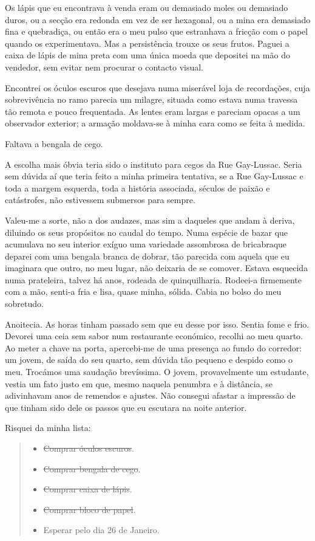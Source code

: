 Os lápis que eu encontrava à venda eram ou demasiado moles ou demasiado
duros, ou a secção era redonda em vez de ser hexagonal, ou a mina era
demasiado fina e quebradiça, ou então era o meu pulso que estranhava a
fricção com o papel quando os experimentava. Mas a persistência trouxe
os seus frutos. Paguei a caixa de lápis de mina preta com uma única
moeda que depositei na mão do vendedor, sem evitar nem procurar o
contacto visual.

Encontrei os óculos escuros que desejava numa miserável loja de
recordações, cuja sobrevivência no ramo parecia um milagre, situada como
estava numa travessa tão remota e pouco frequentada. As lentes eram
largas e pareciam opacas a um observador exterior; a armação moldava-se
à minha cara como se feita à medida.

Faltava a bengala de cego.

A escolha mais óbvia teria sido o instituto para cegos da Rue
Gay-Lussac. Seria sem dúvida aí que teria feito a minha primeira
tentativa, se a Rue Gay-Lussac e toda a margem esquerda, toda a história
associada, séculos de paixão e catástrofes, não estivessem submersos
para sempre.

Valeu-me a sorte, não a dos audazes, mas sim a daqueles que andam à
deriva, diluindo os seus propósitos no caudal do tempo. Numa espécie de
bazar que acumulava no seu interior exíguo uma variedade assombrosa de
bricabraque deparei com uma bengala branca de dobrar, tão parecida com
aquela
que eu imaginara que outro, no meu lugar, não deixaria de se comover.
Estava esquecida numa prateleira, talvez há anos, rodeada de
quinquilharia. Rodeei-a firmemente com a mão, senti-a fria e lisa, quase
minha, sólida. Cabia no bolso do meu sobretudo.

Anoitecia. As horas tinham passado sem que eu desse por isso. Sentia
fome e frio. Devorei uma ceia sem sabor num restaurante económico,
recolhi ao meu quarto. Ao meter a chave na porta, apercebi-me de uma
presença ao fundo do corredor: um jovem, de saída do seu quarto, sem
dúvida tão pequeno e despido como o meu. Trocámos uma saudação
brevíssima. O jovem, provavelmente um estudante, vestia um fato justo em
que, mesmo naquela penumbra e à distância, se adivinhavam anos de
remendos e ajustes. Não consegui afastar a impressão de que tinham sido
dele os passos que eu escutara na noite anterior.

Risquei da minha lista:

\begin{quote}
\begin{itemize}
\item{}\sout{Comprar óculos escuros}.
\item{}\sout{Comprar bengala de cego}.
\item{}\sout{Comprar caixa de lápis}.
\item{}\sout{Comprar bloco de papel}.
\item{}Esperar pelo dia 26 de Janeiro.
\end{itemize}
\end{quote}

